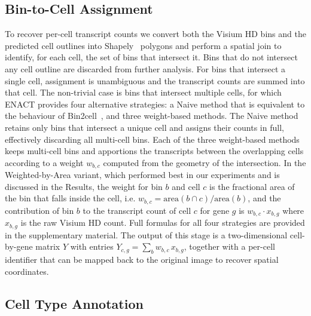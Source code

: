 \documentclass[11pt]{article}
\begin{document}
\subsection{Bin-to-Cell Assignment}

To recover per-cell transcript counts we convert both the Visium HD bins and the predicted cell outlines into Shapely~\cite{shapely2007gillies} polygons and perform a spatial join to identify, for each cell, the set of bins that intersect it. Bins that do not intersect any cell outline are discarded from further analysis. For bins that intersect a single cell, assignment is unambiguous and the transcript counts are summed into that cell. The non-trivial case is bins that intersect multiple cells, for which ENACT provides four alternative strategies: a Naive method that is equivalent to the behaviour of Bin2cell~\cite{polacco2024bin2cell}, and three weight-based methods. The Naive method retains only bins that intersect a unique cell and assigns their counts in full, effectively discarding all multi-cell bins. Each of the three weight-based methods keeps multi-cell bins and apportions the transcripts between the overlapping cells according to a weight $w_{b,c}$ computed from the geometry of the intersection. In the Weighted-by-Area variant, which performed best in our experiments and is discussed in the Results, the weight for bin $b$ and cell $c$ is the fractional area of the bin that falls inside the cell, i.e. $w_{b,c} = \mathrm{area}(b \cap c) / \mathrm{area}(b)$, and the contribution of bin $b$ to the transcript count of cell $c$ for gene $g$ is $w_{b,c}\cdot x_{b,g}$ where $x_{b,g}$ is the raw Visium HD count. Full formulas for all four strategies are provided in the supplementary material. The output of this stage is a two-dimensional cell-by-gene matrix $Y$ with entries $Y_{c,g} = \sum_{b} w_{b,c}\, x_{b,g}$, together with a per-cell identifier that can be mapped back to the original image to recover spatial coordinates.

\subsection{Cell Type Annotation}
\end{document}
